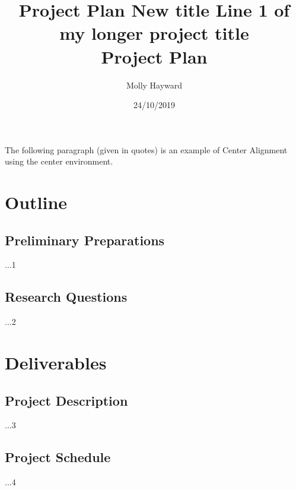 \documentclass[12pt,a4paper]{article}
\title{Project Plan \large \newline 
New title}
\title{%
	Line 1 of my longer project title \\
	\large Project Plan}
\author{Molly Hayward}
\date{24/10/2019}
\begin{document}
\maketitle

\begin{center}
	The following paragraph (given in quotes) is an example of Center Alignment using the center environment. 
\end{center}


\section{Outline}

\subsection{Preliminary Preparations}
...1


\subsection{Research Questions}
...2


\newpage

\section{Deliverables}

\subsection{Project Description}
...3

\subsection{Project Schedule}
...4 

\newpage
\end{document}

